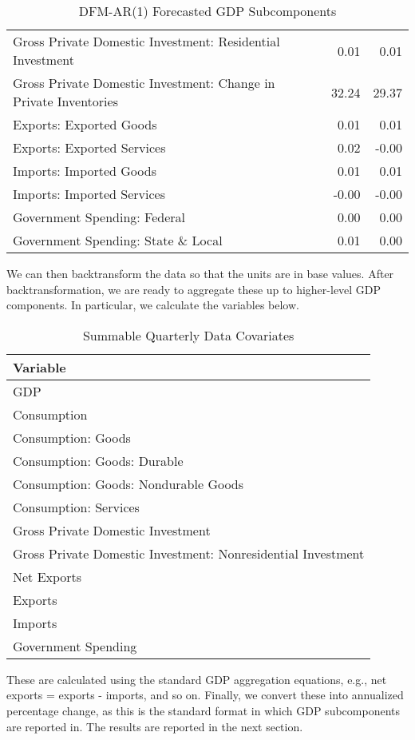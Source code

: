 \documentclass[11pt, letterpaper]{article}\usepackage[]{graphicx}\usepackage[]{color}
\begin{document}
\begin{table}[H]
\begin{tabular}{lrrr}
  Gross Private Domestic Investment: Residential Investment &  & 0.01 & 0.01 \\ 
  Gross Private Domestic Investment: Change in Private Inventories &  & 32.24 & 29.37 \\ 
  Exports: Exported Goods &  & 0.01 & 0.01 \\ 
  Exports: Exported Services &  & 0.02 & -0.00 \\ 
  Imports: Imported Goods &  & 0.01 & 0.01 \\ 
  Imports: Imported Services &  & -0.00 & -0.00 \\ 
  Government Spending: Federal &  & 0.00 & 0.00 \\ 
  Government Spending: State \& Local &  & 0.01 & 0.00 \\ 
   \hline
\end{tabular}
\endgroup
\caption{DFM-AR(1) Forecasted GDP Subcomponents} 
\end{table}


We can then backtransform the data so that the units are in base values. After backtransformation, we are ready to aggregate these up to higher-level GDP components. In particular, we calculate the variables below.
\begin{table}[H]
\centering
\begingroup\scriptsize
\begin{tabular}{l}
  \hline
Variable \\ 
  \hline
GDP \\ 
  Consumption \\ 
  Consumption: Goods \\ 
  Consumption: Goods: Durable \\ 
  Consumption: Goods: Nondurable Goods \\ 
  Consumption: Services \\ 
  Gross Private Domestic Investment \\ 
  Gross Private Domestic Investment: Nonresidential Investment \\ 
  Net Exports \\ 
  Exports \\ 
  Imports \\ 
  Government Spending \\ 
   \hline
\end{tabular}
\endgroup
\caption{Summable Quarterly Data Covariates} 
\end{table}

These are calculated using the standard GDP aggregation equations, e.g., net exports = exports - imports, and so on.
Finally, we convert these into annualized percentage change, as this is the standard format in which GDP subcomponents are reported in. The results are reported in the next section.
\end{document}
